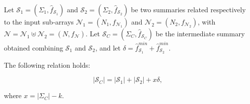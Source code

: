 \documentclass[final,3p,times]{elsarticle}
\newcommand\noi{\noindent}
\begin{document}
\begin{lem}
\label{lemma1}
Let $\mathcal{S}_1 = (\Sigma_1, \hat{f}_{\mathcal{S}_1})$ and $\mathcal{S}_2 = (\Sigma_2, \hat{f}_{\mathcal{S}_2})$ be two summaries related respectively to the input sub-arrays $\mathcal{N}_1 = (N_1, f_{\mathcal{N}_1})$ and $\mathcal{N}_2 = (N_2, f_{\mathcal{N}_2})$, with $\mathcal{N} = \mathcal{N}_1 \uplus \mathcal{N}_2 = (N, f_{\mathcal{N}})$. Let $\mathcal{S}_C = (\Sigma_C, \hat{f}_{\mathcal{S}_C})$ be the intermediate summary obtained combining $\mathcal{S}_1$ and $\mathcal{S}_2$, and let $\delta = \hat{f}_{\mathcal{S}_1}^{min} + \hat{f}_{\mathcal{S}_2}^{min}$.





\noi The following relation holds:

\begin{equation}
\label{eq10}
\left\vert{\mathcal{S}_C}\right\vert = \left\vert{\mathcal{S}_1}\right\vert + \left\vert{\mathcal{S}_2}\right\vert + x \delta,
\end{equation}
\end{lem} 

\noi where $x = \left\vert{\Sigma_C}\right\vert - k$.
\end{document}
